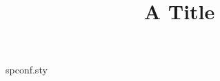 \begin{filecontents*}[overwrite]{spconf.sty}
\def\maketitle{\par
 \begingroup
 \def\thefootnote{}
 \def\@makefnmark{\hbox
 {$^{\@thefnmark}$\hss}}
 \if@twocolumn
 \twocolumn[\@maketitle]
 \else \newpage
 \global\@topnum\z@ \@maketitle \fi\@thanks
 \endgroup
 \setcounter{footnote}{0}
 \let\maketitle\relax
 \let\@maketitle\relax
 \gdef\thefootnote{\arabic{footnote}}\gdef\@@savethanks{}%
 \gdef\@thanks{}\gdef\@author{}\gdef\@title{}\let\thanks\relax}
\def\@maketitle{\newpage\null\vskip 2em\begin{center}{\large\bf\@title\par}\vskip 1.5em{\large\lineskip .5em
  \begin{tabular}[t]{c}\@name\\\@address\end{tabular}\par}\end{center}\par\vskip 1.5em}
\def\name#1{\gdef\@name{{\em #1}\\}}
\def\address#1{\gdef\@address{#1}}
\let\@@savethanks\thanks
\def\thanks#1{\gdef\thefootnote{}\@@savethanks{#1}}
\def\sthanks#1{\gdef\thefootnote{\fnsymbol{footnote}}\@@savethanks{#1}}
\end{filecontents*}
\documentclass{article}
\usepackage{spconf}
\renewcommand{\thefootnote}{\fnsymbol{footnote}}

\title{A Title}
\address{University of Somewhere}
\maketitle
Body.

